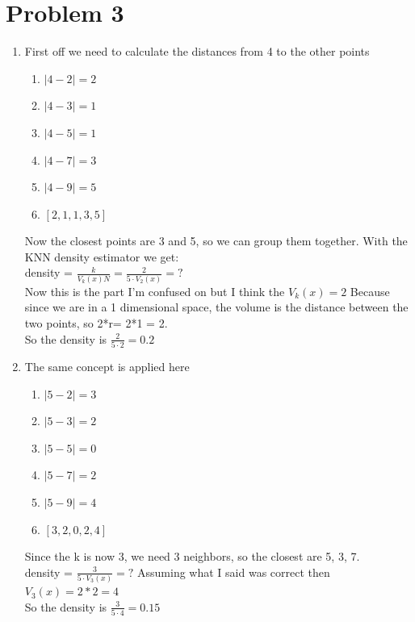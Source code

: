 \documentclass{article}
\begin{document}
\section*{Problem 3}
\begin{enumerate}[label=(\alph*)]
    \item First off we need to calculate the distances from 4 to the other points
    \begin{enumerate}
        \item $ |4-2| = 2$
        \item $ |4-3| = 1$
        \item $ |4-5| = 1$
        \item $|4-7| = 3$
        \item $ |4-9| = 5$
        \item $[2,1,1,3,5]$
    \end{enumerate}
    Now the closest points are 3 and 5, so we can group them together. With the KNN density estimator we get:
    \\density = $\frac{k}{V_{k}(x)N} = \frac{2}{5\cdot V_{2}(x)}=?$
    \\Now this is the part I'm confused on but I think the $V_{k}(x) = 2$ Because since we are in a 1 dimensional space, the volume is the distance between the two points, so 2*r= 2*1 = 2.
    \\So the density is $\frac{2}{5\cdot 2} = 0.2$
    \item The same concept is applied here
    \begin{enumerate}
        \item $ |5-2| = 3$
        \item $ |5-3| = 2$
        \item $ |5-5| = 0$
        \item $|5-7| = 2$
        \item $ |5-9| = 4$
        \item $[3,2,0,2,4]$
    \end{enumerate}
    Since the k is now 3, we need 3 neighbors, so the closest are 5, 3, 7.
    \\density = $\frac{3}{5\cdot V_{3}(x)} = ?$
    Assuming what I said was correct then $V_{3}(x) = 2*2 = 4$
    \\So the density is $\frac{3}{5\cdot 4} = 0.15$
\end{enumerate}
\end{document}
